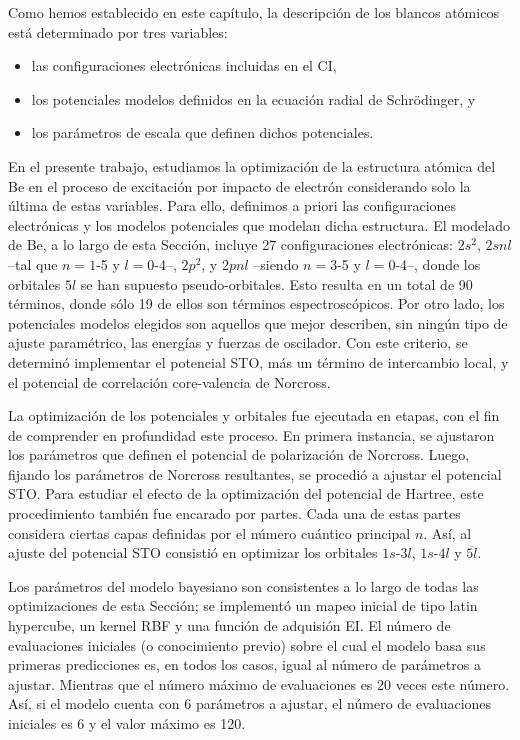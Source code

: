 Como hemos establecido en este capítulo, la descripción de los blancos 
atómicos está determinado por tres variables:
\begin{itemize}
\item las configuraciones electrónicas incluidas en el CI,
\item los potenciales modelos definidos en la ecuación radial de 
Schr\"odinger, y
\item los parámetros de escala que definen dichos potenciales.
\end{itemize}
En el presente trabajo, estudiamos la optimización de la estructura 
atómica del Be en el proceso de excitación por impacto de electrón 
considerando solo la última de estas variables. Para ello, definimos a 
priori las configuraciones electrónicas y los modelos potenciales que
modelan dicha estructura. El modelado de Be, a lo largo de esta Sección,
incluye 27 configuraciones electrónicas: $2s^2$, $2snl$ --tal que 
$n=1$-5 y $l=0$-4--, $2p^2$, y $2pnl$ --siendo $n=3$-5 y $l=0$-4--, 
donde los orbitales $5l$ se han supuesto pseudo-orbitales. Esto resulta 
en un total de 90 términos, donde sólo 19 de ellos son términos 
espectroscópicos. Por otro lado, los potenciales modelos elegidos son 
aquellos que mejor describen, sin ningún tipo de ajuste paramétrico, las 
energías y fuerzas de oscilador. Con este criterio, se determinó 
implementar el potencial STO, más un término de intercambio local, y el 
potencial de correlación core-valencia de Norcross.

La optimización de los potenciales y orbitales fue ejecutada en etapas, 
con el fin de comprender en profundidad este proceso. En primera 
instancia, se ajustaron los parámetros que definen el potencial de 
polarización de Norcross. Luego, fijando los parámetros de Norcross 
resultantes, se procedió a ajustar el potencial STO. Para estudiar el 
efecto de la optimización del potencial de Hartree, este procedimiento 
también fue encarado por partes. Cada una de estas partes considera 
ciertas capas definidas por el número cuántico principal $n$. Así, al 
ajuste del potencial STO consistió en optimizar los orbitales $1s$-$3l$, 
$1s$-$4l$ y $\overline{5l}$.

Los parámetros del modelo bayesiano son consistentes a lo largo de todas 
las optimizaciones de esta Sección; se implementó un mapeo inicial de 
tipo latin hypercube, un kernel RBF y una función de adquisión EI. El 
número de evaluaciones iniciales (o conocimiento previo) sobre el cual el 
modelo basa sus primeras predicciones es, en todos los casos, igual al 
número de parámetros a ajustar. Mientras que el número máximo de 
evaluaciones es 20 veces este número.  Así, si el modelo cuenta con 6 
parámetros a ajustar, el número de evaluaciones iniciales es 6 y el valor
máximo es 120.

